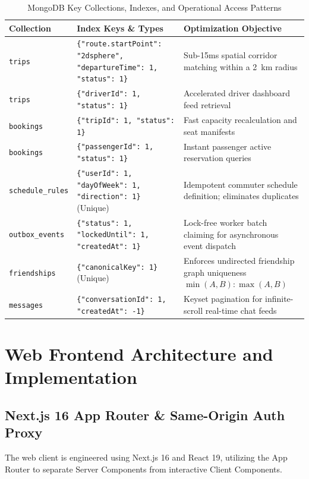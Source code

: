 \documentclass[conference,10pt,a4paper]{IEEEtran}
\begin{document}
\begin{table}[!ht]
\caption{MongoDB Key Collections, Indexes, and Operational Access Patterns}
\label{tab:mongo_indexes}
\centering
\scriptsize
\begin{tabularx}{\columnwidth}{p{1.9cm}p{3.2cm}X}
\toprule
\textbf{Collection} & \textbf{Index Keys \& Types} & \textbf{Optimization Objective} \\
\midrule
\texttt{trips} & \texttt{\{"route.startPoint": "2dsphere", "departureTime": 1, "status": 1\}} & Sub-15ms spatial corridor matching within a 2~km radius \\
\texttt{trips} & \texttt{\{"driverId": 1, "status": 1\}} & Accelerated driver dashboard feed retrieval \\
\texttt{bookings} & \texttt{\{"tripId": 1, "status": 1\}} & Fast capacity recalculation and seat manifests \\
\texttt{bookings} & \texttt{\{"passengerId": 1, "status": 1\}} & Instant passenger active reservation queries \\
\texttt{schedule\_rules} & \texttt{\{"userId": 1, "dayOfWeek": 1, "direction": 1\}} (Unique) & Idempotent commuter schedule definition; eliminates duplicates \\
\texttt{outbox\_events} & \texttt{\{"status": 1, "lockedUntil": 1, "createdAt": 1\}} & Lock-free worker batch claiming for asynchronous event dispatch \\
\texttt{friendships} & \texttt{\{"canonicalKey": 1\}} (Unique) & Enforces undirected friendship graph uniqueness $\min(A,B):\max(A,B)$ \\
\texttt{messages} & \texttt{\{"conversationId": 1, "createdAt": -1\}} & Keyset pagination for infinite-scroll real-time chat feeds \\
\bottomrule
\end{tabularx}
\end{table}

\section{Web Frontend Architecture and Implementation}

\subsection{Next.js 16 App Router \& Same-Origin Auth Proxy}
The web client is engineered using Next.js 16 and React 19, utilizing the App Router to separate Server Components from interactive Client Components.
\end{document}
